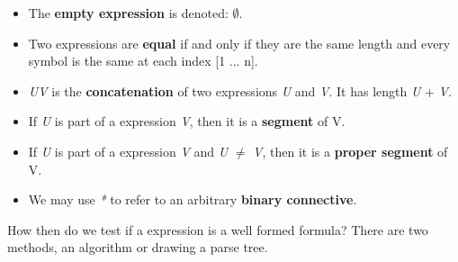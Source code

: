 \begin{itemize}
\item The \textbf{empty expression} is denoted: $\emptyset$.
\item Two expressions are \textbf{equal} if and only if they are the same length and every symbol is the same at each index [1 ... n].
\item \emph{UV} is the \textbf{concatenation} of two expressions \emph{U} and \emph{V}.  It has length \emph{U} + \emph{V}.
\item If \emph{U} is part of a expression \emph{V}, then it is a \textbf{segment} of V.
\item If \emph{U} is part of a expression \emph{V} and \emph{U} $\neq$ \emph{V}, then it is a \textbf{proper segment} of V.
\item We may use \emph{*} to refer to an arbitrary \textbf{binary connective}.
\end{itemize}



How then do we test if a expression is a well formed formula?  There are two methods, an algorithm or drawing a parse tree.\\

